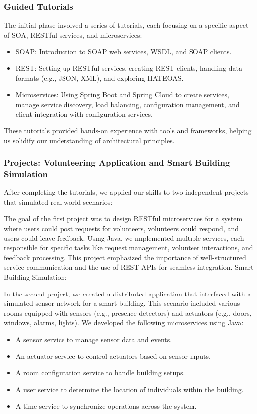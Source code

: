 \subsubsection{Guided Tutorials}
The initial phase involved a series of tutorials, each focusing on a specific aspect of SOA, RESTful services, and microservices:
\begin{itemize}
    \item SOAP: Introduction to SOAP web services, WSDL, and SOAP clients.
    \item REST: Setting up RESTful services, creating REST clients, handling data formats (e.g., JSON, XML), and exploring HATEOAS.
    \item Microservices: Using Spring Boot and Spring Cloud to create services, manage service discovery, load balancing, configuration management, and client integration with configuration services.
\end{itemize}
These tutorials provided hands-on experience with tools and frameworks, helping us solidify our understanding of architectural principles.

\subsubsection{Projects: Volunteering Application and Smart Building Simulation}
After completing the tutorials, we applied our skills to two independent projects that simulated real-world scenarios:

\vspace{0.25cm}
The goal of the first project was to design RESTful microservices for a system where users could post requests for volunteers, volunteers could respond, and users could leave feedback.
Using Java, we implemented multiple services, each responsible for specific tasks like request management, volunteer interactions, and feedback processing. This project emphasized the importance of well-structured service communication and the use of REST APIs for seamless integration.
Smart Building Simulation:

\vspace{0.25cm}
In the second project, we created a distributed application that interfaced with a simulated sensor network for a smart building. This scenario included various rooms equipped with sensors (e.g., presence detectors) and actuators (e.g., doors, windows, alarms, lights).
We developed the following microservices using Java:
\begin{itemize}
    \item A sensor service to manage sensor data and events.
    \item An actuator service to control actuators based on sensor inputs.
    \item A room configuration service to handle building setups.
    \item A user service to determine the location of individuals within the building.
    \item A time service to synchronize operations across the system.
\end{itemize}

